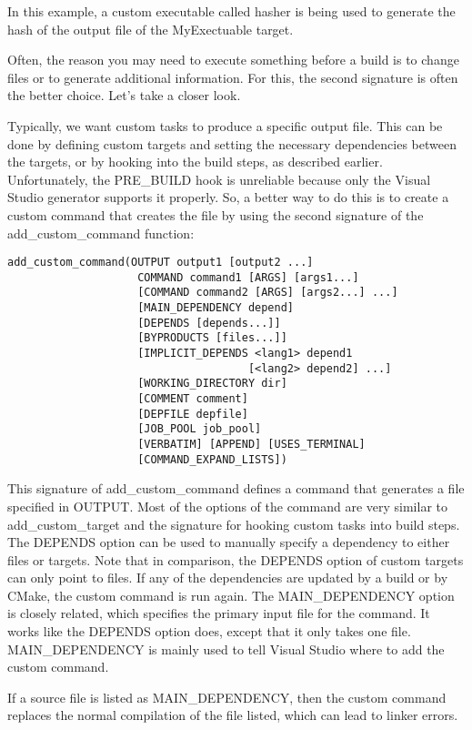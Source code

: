 In this example, a custom executable called hasher is being used to generate the hash of the output file of the MyExectuable target.

Often, the reason you may need to execute something before a build is to change files or to generate additional information. For this, the second signature is often the better choice. Let's take a closer look.


Typically, we want custom tasks to produce a specific output file. This can be done by defining custom targets and setting the necessary dependencies between the targets, or by hooking into the build steps, as described earlier. Unfortunately, the PRE\_BUILD hook is unreliable because only the Visual Studio generator supports it properly. So, a better way to do this is to create a custom command that creates the file by using the second signature of the add\_custom\_command function:

\begin{lstlisting}[style=styleCMake]
add_custom_command(OUTPUT output1 [output2 ...]
					COMMAND command1 [ARGS] [args1...]
					[COMMAND command2 [ARGS] [args2...] ...]
					[MAIN_DEPENDENCY depend]
					[DEPENDS [depends...]]
					[BYPRODUCTS [files...]]
					[IMPLICIT_DEPENDS <lang1> depend1
									 [<lang2> depend2] ...]
					[WORKING_DIRECTORY dir]
					[COMMENT comment]
					[DEPFILE depfile]
					[JOB_POOL job_pool]
					[VERBATIM] [APPEND] [USES_TERMINAL]
					[COMMAND_EXPAND_LISTS])
\end{lstlisting}

This signature of add\_custom\_command defines a command that generates a file specified in OUTPUT. Most of the options of the command are very similar to add\_custom\_target and the signature for hooking custom tasks into build steps. The DEPENDS option can be used to manually specify a dependency to either files or targets. Note that in comparison, the DEPENDS option of custom targets can only point to files. If any of the dependencies are updated by a build or by CMake, the custom command is run again. The MAIN\_DEPENDENCY option is closely related, which specifies the primary input file for the command. It works like the DEPENDS option does, except that it only takes one file. MAIN\_DEPENDENCY is mainly used to tell Visual Studio where to add the custom command.

\begin{tcolorbox}[colback=webgreen!5!white,colframe=webgreen!75!black,title=Note]
If a source file is listed as MAIN\_DEPENDENCY, then the custom command replaces the normal compilation of the file listed, which can lead to linker errors.
\end{tcolorbox}

